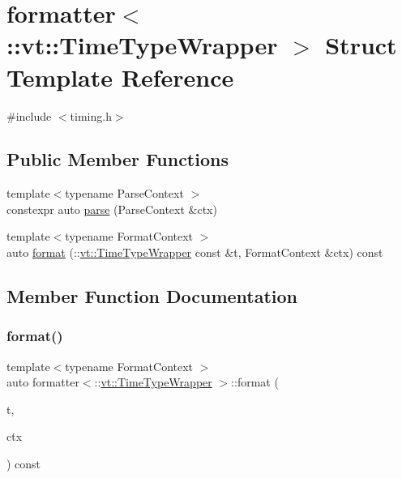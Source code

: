 \hypertarget{structformatter_3_1_1vt_1_1_time_type_wrapper_01_4}{}\section{formatter$<$\+:\+:vt\+:\+:Time\+Type\+Wrapper $>$ Struct Template Reference}
\label{structformatter_3_1_1vt_1_1_time_type_wrapper_01_4}


{\ttfamily \#include $<$timing.\+h$>$}

\subsection*{Public Member Functions}
\begin{DoxyCompactItemize}
\item 
{\footnotesize template$<$typename Parse\+Context $>$ }\\constexpr auto \hyperlink{structformatter_3_1_1vt_1_1_time_type_wrapper_01_4_a44dee4370ae49f065cf791cac1d974b0}{parse} (Parse\+Context \&ctx)
\item 
{\footnotesize template$<$typename Format\+Context $>$ }\\auto \hyperlink{structformatter_3_1_1vt_1_1_time_type_wrapper_01_4_aa2531cd76d3bba8fef03552ee271c1c2}{format} (\+::\hyperlink{structvt_1_1_time_type_wrapper}{vt\+::\+Time\+Type\+Wrapper} const \&t, Format\+Context \&ctx) const
\end{DoxyCompactItemize}


\subsection{Member Function Documentation}
\mbox{\label{structformatter_3_1_1vt_1_1_time_type_wrapper_01_4_aa2531cd76d3bba8fef03552ee271c1c2}} 
\subsubsection{\texorpdfstring{format()}{format()}}
{\footnotesize\ttfamily template$<$typename Format\+Context $>$ \\
auto formatter$<$\+::\hyperlink{structvt_1_1_time_type_wrapper}{vt\+::\+Time\+Type\+Wrapper} $>$\+::format (\begin{DoxyParamCaption}\item[{\+::\hyperlink{structvt_1_1_time_type_wrapper}{vt\+::\+Time\+Type\+Wrapper} const \&}]{t,  }\item[{Format\+Context \&}]{ctx }\end{DoxyParamCaption}) const\hspace{0.3cm}{\ttfamily [inline]}}

